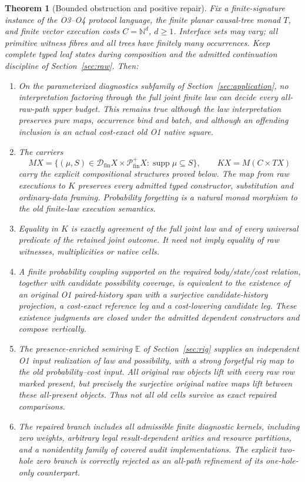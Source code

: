 \documentclass[11pt,a4paper]{article}
\newtheorem{theorem}{Theorem}[section]
\theoremstyle{definition}
\newcommand{\Dfin}{\mathcal D_{\mathrm{fin}}}
\newcommand{\Pfin}{\mathcal P_{\mathrm{fin}}^{+}}
\newcommand{\supp}{\operatorname{supp}}
\newcommand{\E}{\mathbb E}
\begin{document}
\begin{theorem}[Bounded obstruction and positive repair]\label{thm:main}
Fix a finite-signature instance of the O3--O4 protocol language, the finite
planar causal-tree monad $T$, and finite vector execution costs
$C=\mathbb N^d$, $d\geq1$. Interface sets may vary; all primitive witness
fibres and all trees have finitely many occurrences. Keep complete typed
leaf states during composition and the admitted continuation discipline
of Section~\ref{sec:raw}. Then:
\begin{enumerate}[label=\textup{(\roman*)}]
\item On the parameterized diagnostics subfamily of
Section~\ref{sec:application}, no interpretation factoring through the
full joint finite law can decide every all-raw-path upper budget.
This remains true although the law interpretation preserves pure maps,
occurrence bind and batch, and although an offending inclusion is an
actual cost-exact old O1 native square.
\item The carriers
\[
 MX=\{(\mu,S)\in\Dfin X\times\Pfin X:\supp\mu\subseteq S\},
 \qquad KX=M(C\times TX)
\]
carry the explicit compositional structures proved below. The map from
raw executions to $K$ preserves every admitted typed constructor,
substitution and ordinary-data framing. Probability forgetting is a
natural monad morphism to the old finite-law execution semantics.
\item Equality in $K$ is exactly agreement of the full joint law and
of every universal predicate of the retained joint outcome. It need not
imply equality of raw witnesses, multiplicities or native cells.
\item A finite probability coupling supported on the required
body/state/cost relation, together with candidate possibility coverage,
is equivalent to the existence of an original O1 paired-history span
with a surjective candidate-history projection, a cost-exact reference
leg and a cost-lowering candidate leg. These existence judgments are
closed under the admitted dependent constructors and compose vertically.
\item The presence-enriched semiring $\E$ of
Section~\ref{sec:rig} supplies an independent O1 input realization of
law and possibility, with a strong forgetful rig map to the old
probability--cost input. All original raw objects lift with every raw
row marked present, but precisely the surjective original native maps
lift between these all-present objects. Thus not all old cells survive
as exact repaired comparisons.
\item The repaired branch includes all admissible finite diagnostic
kernels, including zero weights, arbitrary legal result-dependent arities
and resource partitions, and a nonidentity family of covered audit
implementations. The explicit two-hole zero branch is correctly rejected
as an all-path refinement of its one-hole-only counterpart.
\end{enumerate}
\end{theorem}
\end{document}
